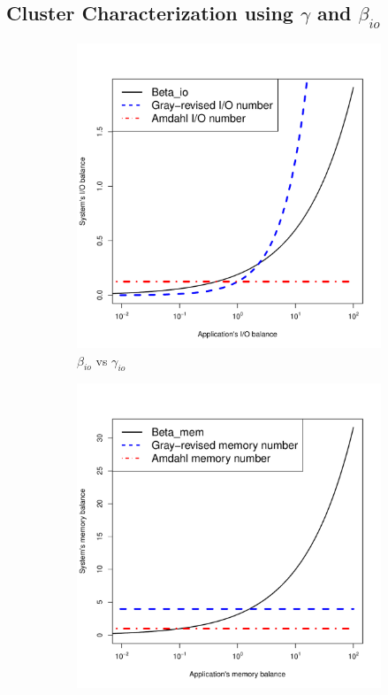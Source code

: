 \documentclass[journal]{IEEEtran}
\begin{document}
\subsection{Cluster Characterization using $\gamma$ and $\beta_{io}$}
\begin{figure}[htb]
	\begin{subfigure}[b]{0.48\textwidth}
                \includegraphics[width=\textwidth]{Figures/ModelFigures/beta_io.pdf}
                \caption{$\beta_{io}$ vs  $\gamma_{io}$}
                \label{fig:beta_io}
    \end{subfigure}
 	\begin{subfigure}[b]{0.48\textwidth}
                \includegraphics[width=\textwidth]{Figures/ModelFigures/beta_mem.pdf}

\end{subfigure}
\end{figure}
\end{document}

